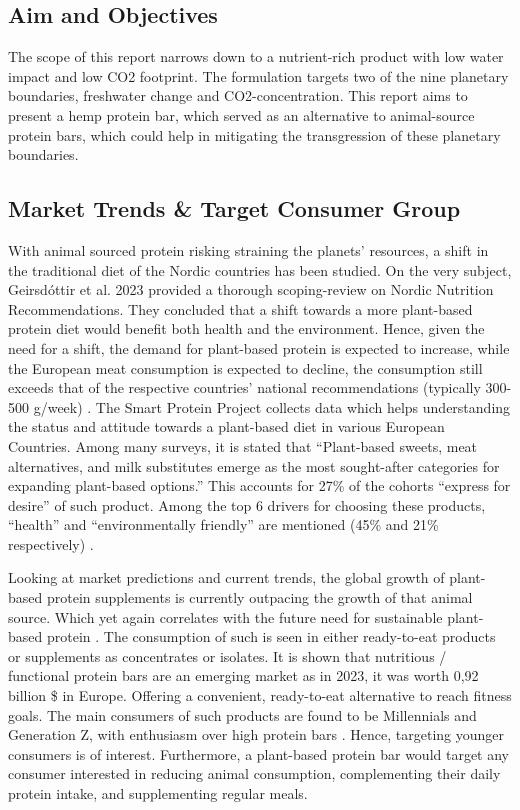 \subsection{Aim and Objectives}
The scope of this report narrows down to a nutrient-rich product with low water impact and low CO2  footprint. The formulation targets two of the nine planetary boundaries, freshwater change and CO2-concentration. This report aims to present a hemp protein bar, which served as an alternative to animal-source protein bars, which could help in mitigating the transgression of these planetary boundaries. 

\subsection{Market Trends \& Target Consumer Group}
With animal sourced protein risking straining the planets' resources, a shift in the traditional diet of the Nordic countries has been studied. On the very subject, Geirsdóttir et al. 2023 provided a thorough scoping-review on Nordic Nutrition Recommendations. They concluded that a shift towards a more plant-based protein diet would benefit both health and the environment. Hence, given the need for a shift, the demand for plant-based protein is expected to increase, while the European meat consumption is expected to decline, the consumption still exceeds that of the respective countries' national recommendations (typically 300-500 g/week) \cite*{OECDFAO2023Outlook}. The Smart Protein Project collects data which helps understanding the status and attitude towards a plant-based diet in various European Countries. Among many surveys, it is stated that “Plant-based sweets, meat alternatives, and milk substitutes emerge as the most sought-after categories for expanding plant-based options.” This accounts for 27\% of the cohorts “express for desire” of such product. Among the top 6 drivers for choosing these products, “health” and “environmentally friendly” are mentioned (45\% and 21\% respectively) \cite*[prenote][postnote]{ProVeg2023EvolvingAppetites}.

\vspace{1em}
Looking at market predictions and current trends, the global growth of plant-based protein supplements is currently outpacing the growth of that animal source. Which yet again correlates with the future need for sustainable plant-based protein \cite*{MarketUS2024PlantProteinSupplements}. The consumption of such is seen in either ready-to-eat products or supplements as concentrates or isolates. It is shown that nutritious / functional protein bars are an emerging market as in 2023, it was worth 0,92 billion \$ in Europe. Offering a convenient, ready-to-eat alternative to reach fitness goals. The main consumers of such products are found to be Millennials and Generation Z, with enthusiasm over high protein bars \cite*{PWConsulting2024HighProteinBarsMarket}. Hence, targeting younger consumers is of interest. Furthermore, a plant-based protein bar would target any consumer interested in reducing animal consumption, complementing their daily protein intake, and supplementing regular meals.

